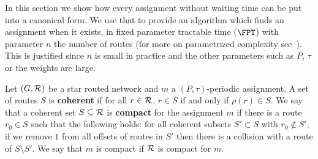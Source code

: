 \documentclass[10pt, conference, letterpaper]{IEEEtran}
\providecommand{\DIFaddtex}[1]{{\protect\color{blue}\uwave{#1}}} %
\providecommand{\DIFaddbegin}{} %
\providecommand{\DIFaddend}{} %
\providecommand{\DIFadd}[1]{\texorpdfstring{\DIFaddtex{#1}}{#1}} %
\newcommand{\DIFaddincludegraphics}[2][]{{\color{blue}\fbox{\DIFOincludegraphics[#1]{#2}}}} %
\DeclareRobustCommand{\DIFaddbegin}{\DIFOaddbegin \let\includegraphics\DIFaddincludegraphics} %
\DeclareRobustCommand{\DIFaddend}{\DIFOaddend \let\includegraphics\DIFOincludegraphics} %
\begin{document}
In this section we show how every assignment without waiting time can be put into a canonical form.
We use that to provide an algorithm which finds an assignment when it exists, in fixed parameter tractable time ($\FPT$) with parameter $n$ the number of routes (for more on parametrized complexity see~\cite{downey2012parameterized}). This is justified since $n$ is small in practice \DIFaddbegin \DIFadd{(from $10$ to $20$) }\DIFaddend and the other parameters such as $P$, $\tau$ or the weights are large.

Let $(G, {\cal R})$ be a star routed network and $m$ a $(P,\tau)$-periodic assignment.
A set of routes $S$ is \textbf{coherent} if for all $r \in {\cal R}$, $r \in S$ if and only if $\rho(r) \in S$. We say that a coherent set $S \subseteq {\cal R}$ is \textbf{compact} for the assignment $m$ if there is a route $r_0 \in S$ such that the following holds:  
for all coherent subsets $S'\subset S$ with $r_0 \notin S'$, if we remove $1$ from all offsets of routes in $S'$ then there is a collision with a route of $S \setminus S'$. We say that $m$ is compact if ${\cal R}$ is compact for $m$. 
% 
% 
\end{document}
